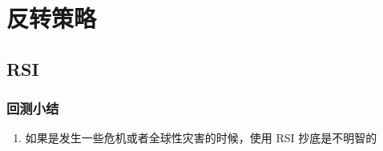 \chapter{反转策略}
\section{RSI}
\subsection{回测小结}

\begin{tcolorbox}
    \begin{enumerate}
        \item 如果是发生一些危机或者全球性灾害的时候，使用 RSI 抄底是不明智的
    \end{enumerate}
\end{tcolorbox}